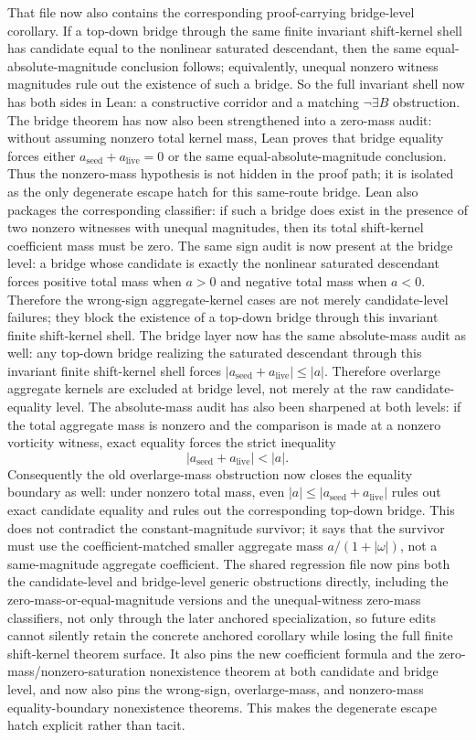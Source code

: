 \documentclass[11pt]{article}
\begin{document}
That file now also contains the corresponding proof-carrying bridge-level
corollary.  If a top-down bridge through the same finite invariant shift-kernel
shell has candidate equal to the nonlinear saturated descendant, then the same
equal-absolute-magnitude conclusion follows; equivalently, unequal nonzero
witness magnitudes rule out the existence of such a bridge.  So the full
invariant shell now has both sides in Lean: a constructive corridor and a
matching \(\neg \exists B\) obstruction.
The bridge theorem has now also been strengthened into a zero-mass audit:
without assuming nonzero total kernel mass, Lean proves that bridge equality
forces either \(a_{\mathrm{seed}}+a_{\mathrm{live}}=0\) or the same
equal-absolute-magnitude conclusion.  Thus the nonzero-mass hypothesis is not
hidden in the proof path; it is isolated as the only degenerate escape hatch
for this same-route bridge.  Lean also packages the corresponding classifier:
if such a bridge does exist in the presence of two nonzero witnesses with
unequal magnitudes, then its total shift-kernel coefficient mass must be zero.
The same sign audit is now present at the bridge level: a bridge whose
candidate is exactly the nonlinear saturated descendant forces positive total
mass when \(a>0\) and negative total mass when \(a<0\).  Therefore the
wrong-sign aggregate-kernel cases are not merely candidate-level failures; they
block the existence of a top-down bridge through this invariant finite
shift-kernel shell.
The bridge layer now has the same absolute-mass audit as well: any top-down
bridge realizing the saturated descendant through this invariant finite
shift-kernel shell forces
\(|a_{\mathrm{seed}}+a_{\mathrm{live}}|\le |a|\).  Therefore overlarge
aggregate kernels are excluded at bridge level, not merely at the raw
candidate-equality level.
The absolute-mass audit has also been sharpened at both levels: if the total
aggregate mass is nonzero and the comparison is made at a nonzero vorticity
witness, exact equality forces the strict inequality
\[
  |a_{\mathrm{seed}}+a_{\mathrm{live}}| < |a|.
\]
Consequently the old overlarge-mass obstruction now closes the equality
boundary as well: under nonzero total mass, even
\(|a|\le |a_{\mathrm{seed}}+a_{\mathrm{live}}|\) rules out exact candidate
equality and rules out the corresponding top-down bridge.  This does not
contradict the constant-magnitude survivor; it says that the survivor must use
the coefficient-matched smaller aggregate mass
\(a/(1+|\omega|)\), not a same-magnitude aggregate coefficient.
The shared regression file now pins both the candidate-level and bridge-level
generic obstructions directly, including the zero-mass-or-equal-magnitude
versions and the unequal-witness zero-mass classifiers, not only through the
later anchored specialization, so future edits cannot silently retain the
concrete anchored corollary while losing the full finite shift-kernel theorem
surface.
It also pins the new coefficient formula and the zero-mass/nonzero-saturation
nonexistence theorem at both candidate and bridge level, and now also pins the
wrong-sign, overlarge-mass, and nonzero-mass equality-boundary nonexistence
theorems.  This makes the degenerate escape hatch explicit rather than tacit.
\end{document}
